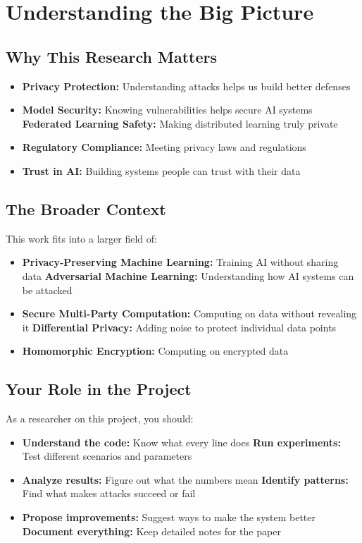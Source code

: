 \documentclass[12pt]{article}
\begin{document}
\section{Understanding the Big Picture}

\subsection{Why This Research Matters}

\begin{itemize}
    \item \textbf{Privacy Protection:} Understanding attacks helps us build better defenses
    \item \textbf{Model Security:} Knowing vulnerabilities helps secure AI systems
    \textbf{Federated Learning Safety:} Making distributed learning truly private
    \item \textbf{Regulatory Compliance:} Meeting privacy laws and regulations
    \item \textbf{Trust in AI:} Building systems people can trust with their data
\end{itemize}

\subsection{The Broader Context}

This work fits into a larger field of:
\begin{itemize}
    \item \textbf{Privacy-Preserving Machine Learning:} Training AI without sharing data
    \textbf{Adversarial Machine Learning:} Understanding how AI systems can be attacked
    \item \textbf{Secure Multi-Party Computation:} Computing on data without revealing it
    \textbf{Differential Privacy:} Adding noise to protect individual data points
    \item \textbf{Homomorphic Encryption:} Computing on encrypted data
\end{itemize}

\subsection{Your Role in the Project}

As a researcher on this project, you should:
\begin{itemize}
    \item \textbf{Understand the code:} Know what every line does
    \textbf{Run experiments:} Test different scenarios and parameters
    \item \textbf{Analyze results:} Figure out what the numbers mean
    \textbf{Identify patterns:} Find what makes attacks succeed or fail
    \item \textbf{Propose improvements:} Suggest ways to make the system better
    \textbf{Document everything:} Keep detailed notes for the paper
\end{itemize}
\end{document}
